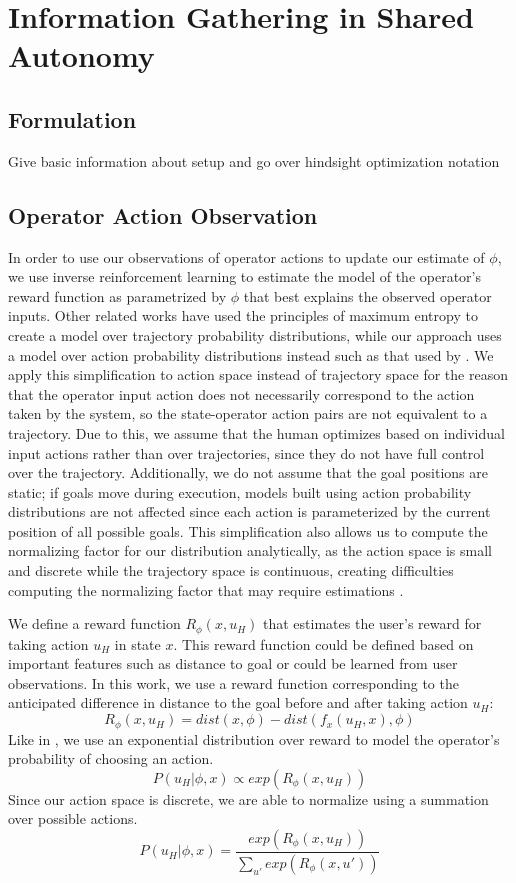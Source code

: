 \documentclass[conference]{IEEEtran}
\begin{document}
\section{Information Gathering in Shared Autonomy}
\subsection{Formulation}

Give basic information about setup and go over hindsight optimization notation 

\subsection{Operator Action Observation}
In order to use our observations of operator actions to update our estimate of $\phi$, we use inverse reinforcement learning to estimate the model of the operator's reward function as parametrized by $\phi$ that best explains the observed operator inputs. Other related works \cite{dragan2012formalizing, javdani2015shared} have used the principles of maximum entropy \cite{ziebart2008maximum} to create a model over trajectory probability distributions, while our approach uses a model over action probability distributions instead such as that used by \citet{ramachandran2007bayesian}. We apply this simplification to action space instead of trajectory space for the reason that the operator input action does not necessarily correspond to the action taken by the system, so the state-operator action pairs are not equivalent to a trajectory. Due to this, we assume that the human optimizes based on individual input actions rather than over trajectories, since they do not have full control over the trajectory. Additionally, we do not assume that the goal positions are static; if goals move during execution, models built using action probability distributions are not affected since each action is parameterized by the current position of all possible goals. This simplification also allows us to compute the normalizing factor for our distribution analytically, as the action space is small and discrete while the trajectory space is continuous, creating difficulties computing the normalizing factor that may require estimations \cite{javdani2015shared}.

We define a reward function $R_\phi (x, u_H)$ that estimates the user's reward for taking action $u_H$ in state $x$. This reward function could be defined based on important features such as distance to goal or could be learned from user observations. In this work, we use a reward function corresponding to the anticipated difference in distance to the goal before and after taking action $u_H$: 
\[
R_\phi (x, u_H) = dist(x, \phi) - dist(f_x(u_H, x), \phi)
\]
Like in \cite{ramachandran2007bayesian}, we use an exponential distribution over reward to model the operator's probability of choosing an action.
\[
P(u_H|\phi, x) \propto exp(R_\phi (x, u_H))
\]
Since our action space is discrete, we are able to normalize using a summation over possible actions.
\[
P(u_H|\phi, x) = \frac{exp(R_\phi (x, u_H))}{\sum_{u'} exp(R_\phi (x, u'))}
\]
\end{document}
